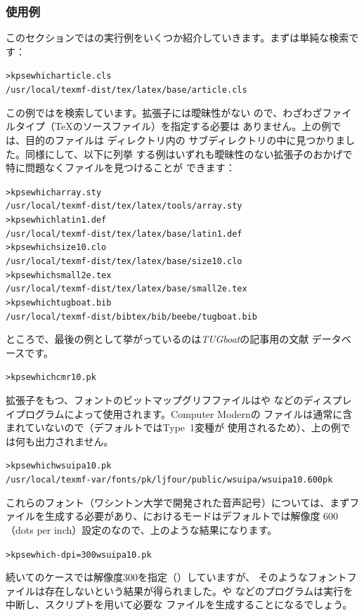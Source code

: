 \documentclass[uplatex,dvipdfmx,12pt,tombow]{jsarticle}
\begin{document}
\subsubsection{使用例}
\label{sec:examples-of-use}

このセクションでは\KPS の実行例をいくつか紹介していきます。まずは単純な検索です：
%
\begin{alltt}
> kpsewhich article.cls
   /usr/local/texmf-dist/tex/latex/base/article.cls
\end{alltt}
%
この例ではを検索しています。拡張子には曖昧性がない
ので、わざわざファイルタイプ（\TeX のソースファイル）を指定する必要は
ありません。上の例では、目的のファイルは \TL ディレクトリ内の
サブディレクトリの中に見つかりました。同様にして、以下に列挙
する例はいずれも曖昧性のない拡張子のおかげで特に問題なくファイルを見つけることが
できます：
%
\begin{alltt}
> kpsewhich array.sty
   /usr/local/texmf-dist/tex/latex/tools/array.sty
> kpsewhich latin1.def
   /usr/local/texmf-dist/tex/latex/base/latin1.def
> kpsewhich size10.clo
   /usr/local/texmf-dist/tex/latex/base/size10.clo
> kpsewhich small2e.tex
   /usr/local/texmf-dist/tex/latex/base/small2e.tex
> kpsewhich tugboat.bib
   /usr/local/texmf-dist/bibtex/bib/beebe/tugboat.bib
\end{alltt}
%
ところで、最後の例として挙がっているのは\textsl{TUGboat}の記事用の\BibTeX 文献
データベースです。

\begin{alltt}
> kpsewhich cmr10.pk
\end{alltt}
%
拡張子をもつ、フォントのビットマップグリフファイルはや
などのディスプレイプログラムによって使用されます。Computer Modernの
ファイルは通常\TL に含まれていないので（デフォルトではType~1変種が
使用されるため）、上の例では何も出力されません。

\begin{alltt}
> kpsewhich wsuipa10.pk
   /usr/local/texmf-var/fonts/pk/ljfour/public/wsuipa/wsuipa10.600pk
\end{alltt}
%
これらのフォント（ワシントン大学で開発された音声記号）については、まずファイルを生成する必要があり、\TL における\MF モードはデフォルトでは解像度
600{\dpi}（dots per inch）設定のなので、上のような結果になります。
%
\begin{alltt}
> kpsewhich -dpi=300 wsuipa10.pk
\end{alltt}
%
続いてのケースでは解像度300\dpi を指定（）していますが、
そのようなフォントファイルは存在しないという結果が得られました。や
などのプログラムは実行を中断し、スクリプトを用いて必要な
ファイルを生成することになるでしょう。
\end{document}
